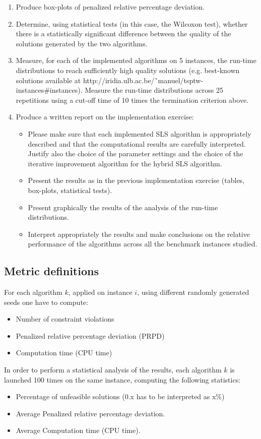 \begin{homeworkProblem}
\begin{enumerate}
\item Produce box-plots of penalized relative percentage deviation.
\item Determine, using statistical tests (in this case, the Wilcoxon test), whether there is a statistically significant difference between the quality of the solutions generated by the two algorithms.
\item Measure, for each of the implemented algorithms on 5 instances, the run-time distributions to reach sufficiently high quality solutions (e.g. best-known solutions available at http://iridia.ulb.ac.be/˜manuel/tsptw-instances\#instances).
Measure the run-time distributions across 25 repetitions using a cut-off time of 10 times the termination criterion above.
\item Produce a written report on the implementation exercise:
\begin{itemize}
  \item Please make sure that each implemented SLS algorithm is appropriately described and that the computational results are carefully interpreted. Justify also the choice of the parameter settings and the choice
of the iterative improvement algorithm for the hybrid SLS algorithm.
  \item Present the results as in the previous implementation exercise (tables, box-plots, statistical tests).
  \item Present graphically the results of the analysis of the run-time distributions.
  \item Interpret appropriately the results and make conclusions on the relative performance of the algorithms across all the benchmark instances studied.
\end{itemize}
\end{enumerate}

\subsection{Metric definitions}\label{subsec:metric}
For each algorithm $k$, applied on instance $i$, using different randomly generated seeds one have to compute:
\begin{itemize}
  \item Number of constraint violations
  \item Penalized relative percentage deviation (PRPD)
  \item Computation time (CPU time)
\end{itemize}

In order to perform a statistical analysis of the results, each algorithm $k$ is launched 100 times on the same instance, computing the
following statistics:
\begin{itemize}
  \item Percentage of unfeasible solutions (0.x has to be interpreted as x\%) 
  \item Average Penalized relative percentage deviation.
  \item Average Computation time (CPU time).
\end{itemize}


\end{homeworkProblem}
